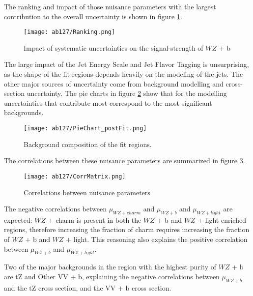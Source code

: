 The ranking and impact of those nuisance parameters with the largest contribution to the overall uncertainty is shown in figure \ref{fig:ranking}.

\begin{figure}[H]
    \centering
    \texttt{[image: ab127/Ranking.png]}
    \caption{Impact of systematic uncertainties on the signal-strength of $WZ$ + b}
    \label{fig:ranking}
\end{figure}

The large impact of the Jet Energy Scale and Jet Flavor Tagging is unsurprising, as the shape of the fit regions depends heavily on the modeling of the jets. The other major sources of uncertainty come from background modelling and cross-section uncertainty. The pie charts in figure \ref{fig:pie_chart} show that for the modelling uncertainties that contribute most correspond to the most significant backgrounds. %

\begin{figure}[H]
    \centering
    \texttt{[image: ab127/PieChart\_postFit.png]}
    \caption{Background composition of the fit regions.}
    \label{fig:pie_chart}
\end{figure}

The correlations between these nuisance parameters are summarized in figure \ref{fig:corr_mat}. 

\begin{figure}[H]
    \centering
    \texttt{[image: ab127/CorrMatrix.png]}
    \caption{Correlations between nuisance parameters}
    \label{fig:corr_mat}
\end{figure}

The negative correlations between $\mu_{WZ+charm}$ and $\mu_{WZ+b}$ and $\mu_{WZ+light}$ are expected: $WZ$ + charm is present in both the $WZ$ + b and $WZ$ + light enriched regions, therefore increasing the fraction of charm requires increasing the fraction of $WZ$ + b and $WZ$ + light. This reasoning also explains the positive correlation between $\mu_{WZ+b}$ and $\mu_{WZ+light}$. 

Two of the major backgrounds in the region with the highest purity of $WZ$ + b are tZ and Other VV + b, explaining the negative correlations between $\mu_{WZ+b}$ and the tZ cross section, and the VV + b cross section.

